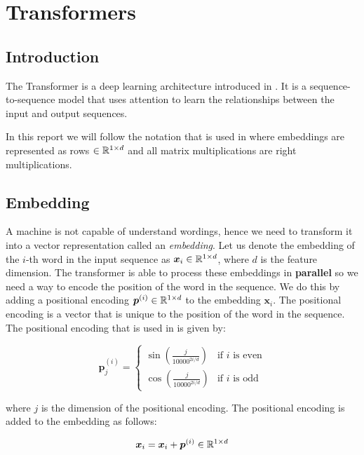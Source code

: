 \documentclass[../main.tex]{subfiles}
\begin{document}
\section{Transformers}
\subsection{Introduction}

The Transformer is a deep learning architecture introduced in \cite{vaswani2017attention}. It is a sequence-to-sequence model that uses attention to learn the relationships between the input and output sequences.

In this report we will follow the notation that is used in \cite{vaswani2017attention} where embeddings are represented as rows $\in \mathbb{R}^{1 \times d}$ and all matrix multiplications are right multiplications. 

\subsection{Embedding}

A machine is not capable of understand wordings, hence we need to transform it into a vector representation called an \emph{embedding}. Let us denote the embedding of the $i$-th word in the input sequence as $\bm{x}_i \in \mathbb{R}^{1 \times d}$, where $d$ is the feature dimension. The transformer is able to process these embeddings in \textbf{parallel} so we need a way to encode the position of the word in the sequence. We do this by adding a positional encoding $\bm{p}^{(i)} \in \mathbb{R}^{1 \times d}$ to the embedding $\bm{x}_i$. The positional encoding is a vector that is unique to the position of the word in the sequence. The positional encoding that is used in \cite{vaswani2017attention} is given by:

\begin{equation}
	\bm{p}_j^{(i)} = \begin{cases}
		\sin(\frac{j}{10000^{2i/d}}) & \text{if } i \text{ is even} \\
		\cos(\frac{j}{10000^{2i/d}}) & \text{if } i \text{ is odd}
	\end{cases}
\end{equation}

\noi where $j$ is the dimension of the positional encoding. The positional encoding is added to the embedding as follows:

\begin{equation}
	\bm{x}_i = \bm{x}_i + \bm{p}^{(i)} \in \mathbb{R}^{1 \times d}
\end{equation}
\end{document}
